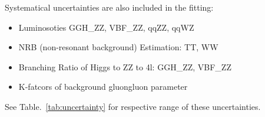 Systematical uncertainties are also included in the fitting:
\begin{itemize}
    \item Luminosoties GGH\_ZZ, VBF\_ZZ, qqZZ, qqWZ
    \item NRB (non-resonant background) Estimation: TT, WW
    \item Branching Ratio of Higgs to ZZ to 4l: GGH\_ZZ, VBF\_ZZ
    \item K-fatcors of background gluongluon parameter
\end{itemize}
See Table.~\ref{tab:uncertainty} for respective range of these uncertainties.

